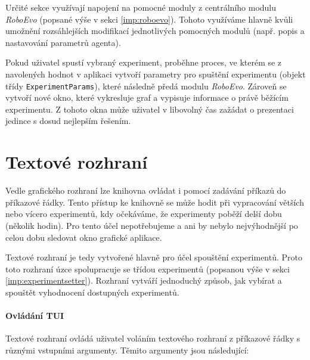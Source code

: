 Určité sekce využívají napojení na pomocné moduly z centrálního modulu
\emph{RoboEvo} (popsané výše v sekci \ref{imp:roboevo}). Tohoto využíváme
hlavně kvůli umožnění rozsáhlejších modifikací jednotlivých pomocných modulů
(např. popis a nastavování parametrů agenta).

Pokud uživatel spustí vybraný experiment, proběhne proces, ve kterém se z
navolených hodnot v aplikaci vytvoří parametry pro spuštění experimentu (objekt
třídy \texttt{ExperimentParams}), které následně předá modulu \emph{RoboEvo}.
Zároveň se vytvoří nové okno, které vykresluje graf a vypisuje informace o
právě běžícím experimentu. Z tohoto okna může uživatel v libovolný čas zažádat
o prezentaci jedince s dosud nejlepším řešením.

\section{Textové rozhraní} \label{imp:TUI}
Vedle grafického rozhraní lze knihovna ovládat i pomocí zadávání příkazů do
příkazové řádky. Tento přístup ke knihovně se může hodit při vypracování
větších nebo vícero experimentů, kdy očekáváme, že experimenty poběží delší
dobu (několik hodin). Pro tento účel nepotřebujeme a ani by nebylo
nejvýhodnější po celou dobu sledovat okno grafické aplikace.

Textové rozhraní je tedy vytvořené hlavně pro účel spouštění experimentů. Proto
toto rozhraní úzce spolupracuje se třídou experimentů (popsanou výše v sekci
\ref{imp:experimentsetter}). Rozhraní vytváří jednoduchý způsob, jak vybírat a
spouštět vyhodnocení dostupných experimentů.

\paragraph{Ovládání TUI}
Textové rozhraní ovládá uživatel voláním textového rozhraní z příkazové řádky s
různými vstupními argumenty. Těmito argumenty jsou následující:

